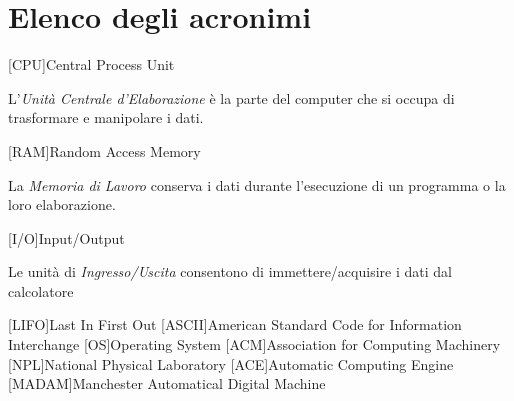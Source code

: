 \chapter{Elenco degli acronimi}
\begin{acronym}[MADAM]
	[CPU]{\foreignlanguage{english}Central Process Unit}
{\small\par\noindent L'\emph{Unità Centrale d'Elaborazione} è la parte del computer che si occupa di trasformare e manipolare i dati.}
	[RAM]{\foreignlanguage{english}Random Access Memory}
{\small\par\noindent La \emph{Memoria di Lavoro} conserva i dati durante l'esecuzione di un programma o la loro elaborazione.}
	[I/O]{\foreignlanguage{english}Input/Output}
{\small\par\noindent Le unità di \emph{Ingresso/Uscita} consentono di immettere/acquisire i dati dal calcolatore}
	[LIFO]{\foreignlanguage{english}Last In First Out}
	[ASCII]{\foreignlanguage{english}American Standard Code for Information Interchange}
	[OS]{\foreignlanguage{english}Operating System}
	[ACM]{\foreignlanguage{english}Association for Computing Machinery}
	[NPL]{\foreignlanguage{english}National Physical Laboratory}
	[ACE]{\foreignlanguage{english}Automatic Computing Engine}
	[MADAM]{\foreignlanguage{english}Manchester Automatical Digital Machine}
\end{acronym}
